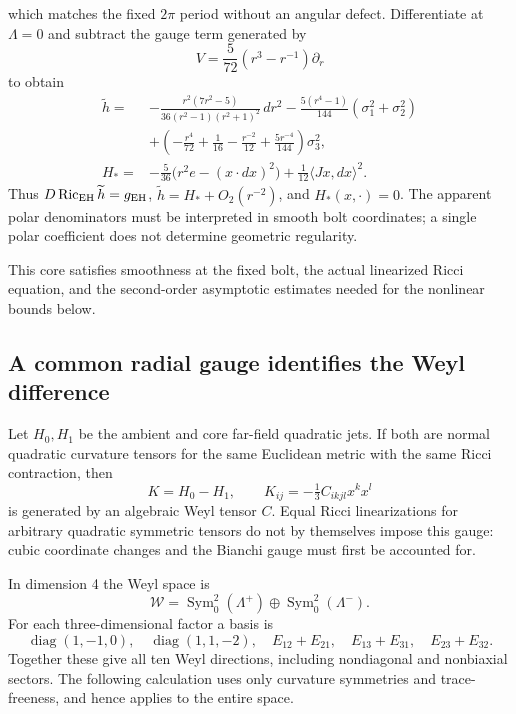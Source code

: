 \documentclass[a4paper,11pt]{article}
\numberwithin{equation}{section}
\theoremstyle{definition}
\newcommand{\Ric}{\operatorname{Ric}}
\begin{document}
which matches the fixed $2\pi$ period without an angular defect. Differentiate at $\Lambda=0$ and subtract the gauge term generated by
\[
V=\frac5{72}(r^3-r^{-1})\partial_r
\]
to obtain
\begin{align}
\widetilde h={}&-\frac{r^2(7r^2-5)}{36(r^2-1)(r^2+1)^2}\,dr^2
-\frac{5(r^4-1)}{144}(\sigma_1^2+\sigma_2^2)\\
&+\left(-\frac{r^4}{72}+\frac1{16}-\frac{r^{-2}}{12}
+\frac{5r^{-4}}{144}\right)\sigma_3^2,\nonumber\\
H_*={}&-\frac5{36}\bigl(r^2e-(x\cdot dx)^2\bigr)
+\frac1{12}\langle Jx,dx\rangle^2.
\end{align}
Thus $D\Ric_{\rm EH}\widetilde h=g_{\rm EH}$, $\widetilde h=H_*+O_2(r^{-2})$, and $H_*(x,\cdot)=0$. The apparent polar denominators must be interpreted in smooth bolt coordinates; a single polar coefficient does not determine geometric regularity.

This core satisfies smoothness at the fixed bolt, the actual linearized Ricci equation, and the second-order asymptotic estimates needed for the nonlinear bounds below.

\subsection{A common radial gauge identifies the Weyl difference}
Let $H_0,H_1$ be the ambient and core far-field quadratic jets. If both are normal quadratic curvature tensors for the same Euclidean metric with the same Ricci contraction, then
\[
K=H_0-H_1,\qquad
K_{ij}=-\tfrac13 C_{ikjl}x^kx^l
\]
is generated by an algebraic Weyl tensor $C$. Equal Ricci linearizations for arbitrary quadratic symmetric tensors do not by themselves impose this gauge: cubic coordinate changes and the Bianchi gauge must first be accounted for.

In dimension 4 the Weyl space is
\[
\mathcal W=\operatorname{Sym}^2_0(\Lambda^+)\oplus
\operatorname{Sym}^2_0(\Lambda^-).
\]
For each three-dimensional factor a basis is
\[
\operatorname{diag}(1,-1,0),\quad
\operatorname{diag}(1,1,-2),\quad
E_{12}+E_{21},\quad E_{13}+E_{31},\quad E_{23}+E_{32}.
\]
Together these give all ten Weyl directions, including nondiagonal and nonbiaxial sectors. The following calculation uses only curvature symmetries and trace-freeness, and hence applies to the entire space.
\end{document}
